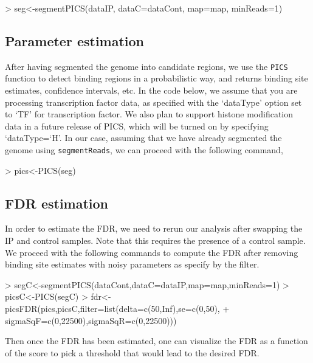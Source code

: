 \documentclass[a4paper]{article}
\begin{document}
\begin{Schunk}
\begin{Sinput}
> seg<-segmentPICS(dataIP, dataC=dataCont, map=map, minReads=1)
\end{Sinput}
\end{Schunk}


\subsection{Parameter estimation}
After having segmented the genome into candidate regions, we use the \texttt{PICS} function to detect binding regions in a probabilistic way, and returns binding site estimates, confidence intervals, etc. In the code below, we assume that you are processing transcription factor data, as specified with the `dataType' option set to `TF' for transcription factor. We also plan to support histone modification data in a future release of PICS, which will be turned on by specifying `dataType=`H'. In our case, assuming that we have already segmented the genome using \texttt{segmentReads}, we can proceed with the following command, 

\begin{Schunk}
\begin{Sinput}
> pics<-PICS(seg)
\end{Sinput}
\end{Schunk}

\subsection{FDR estimation}
In order to estimate the FDR, we need to rerun our analysis after swapping the IP and control samples. Note that this requires the presence of a control sample. We proceed with the following commands to compute the FDR after removing binding site estimates with noisy parameters as specify by the filter. 

\begin{Schunk}
\begin{Sinput}
> segC<-segmentPICS(dataCont,dataC=dataIP,map=map,minReads=1)
> picsC<-PICS(segC)
> fdr<-picsFDR(pics,picsC,filter=list(delta=c(50,Inf),se=c(0,50),
+ sigmaSqF=c(0,22500),sigmaSqR=c(0,22500)))
\end{Sinput}
\end{Schunk}

Then once the FDR has been estimated, one can visualize the FDR as a function of the score to pick a threshold that would lead to the desired FDR. 
\end{document}
